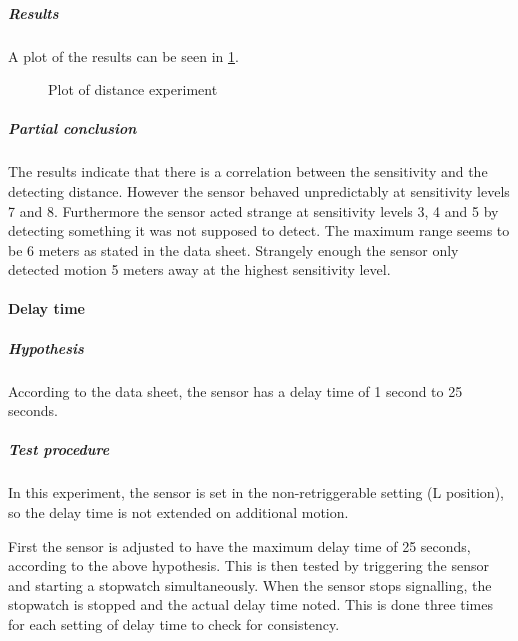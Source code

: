 \subparagraph{Results}

A plot of the results can be seen in \cref{fig:pir_distance}.

\begin{figure}[htbp]
\centering
{}
\caption{Plot of distance experiment}\label{fig:pir_distance}
\end{figure}

\subparagraph{Partial conclusion}
The results indicate that there is a correlation between the sensitivity and the detecting distance.
However the sensor behaved unpredictably at sensitivity levels 7 and 8.
Furthermore the sensor acted strange at sensitivity levels 3, 4 and 5 by detecting something it was not supposed to detect.
The maximum range seems to be 6 meters as stated in the data sheet.
Strangely enough the sensor only detected motion 5 meters away at the highest
sensitivity level.

\paragraph{Delay time}

\subparagraph{Hypothesis}

According to the data sheet, the sensor has a delay time of 1 second to 25 seconds.

\subparagraph{Test procedure}

In this experiment, the sensor is set in the non-retriggerable setting (L
position), so the delay time is not extended on additional motion.

First the sensor is adjusted to have the maximum delay time of 25 seconds,
according to the above hypothesis. This is then tested by triggering the sensor
and starting a stopwatch simultaneously. When the sensor stops signalling, the
stopwatch is stopped and the actual delay time noted. This is done three times
for each setting of delay time to check for consistency.

